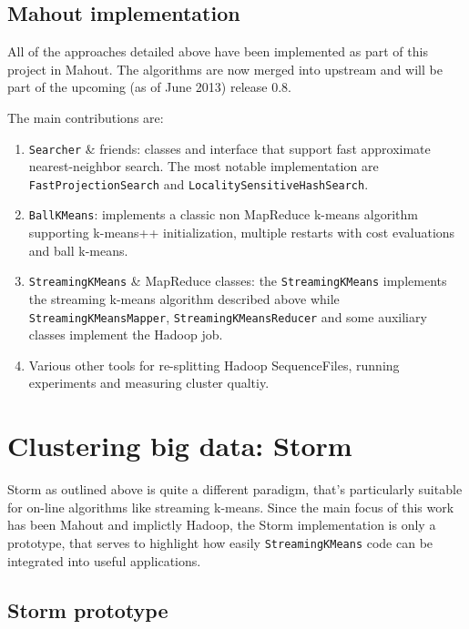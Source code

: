 \documentclass{article}
\begin{document}
\subsection{Mahout implementation}

All of the approaches detailed above have been implemented as part of this
project in Mahout. The algorithms are now merged into upstream and will be part
of the upcoming (as of June 2013) release 0.8.

The main contributions are:
\begin{enumerate}
    \item \texttt{Searcher} \& friends: classes and interface that support fast
        approximate nearest-neighbor search. The most notable implementation
        are \\ \texttt{FastProjectionSearch} and
        \texttt{LocalitySensitiveHashSearch}.
    \item \texttt{BallKMeans}: implements a classic non MapReduce k-means
        algorithm supporting k-means++ initialization, multiple restarts with
        cost evaluations and ball k-means.
    \item \texttt{StreamingKMeans} \& MapReduce classes: the
        \texttt{StreamingKMeans} implements the streaming k-means algorithm
        described above while \\ \texttt{StreamingKMeansMapper},
        \texttt{StreamingKMeansReducer} and some auxiliary classes implement
        the Hadoop job.
    \item Various other tools for re-splitting Hadoop SequenceFiles, running
        experiments and measuring cluster qualtiy.
\end{enumerate}

\section{Clustering big data: Storm}

Storm as outlined above is quite a different paradigm, that's particularly
suitable for on-line algorithms like streaming k-means. Since the main focus of
this work has been Mahout and implictly Hadoop, the Storm implementation is
only a prototype, that serves to highlight how easily \texttt{StreamingKMeans}
code can be integrated into useful applications.

\subsection{Storm prototype}
\end{document}
